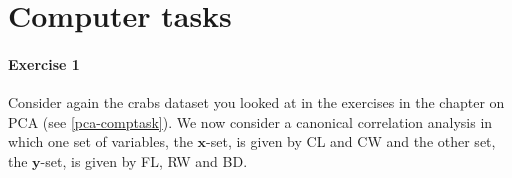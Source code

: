 \documentclass[]{book}
\newenvironment{Shaded}{\begin{snugshade}}{\end{snugshade}}
\newcommand{\CommentTok}[1]{\textcolor[rgb]{0.56,0.35,0.01}{\textit{#1}}}
\newcommand{\DecValTok}[1]{\textcolor[rgb]{0.00,0.00,0.81}{#1}}
\newcommand{\KeywordTok}[1]{\textcolor[rgb]{0.13,0.29,0.53}{\textbf{#1}}}
\newcommand{\NormalTok}[1]{#1}
\newcommand{\OperatorTok}[1]{\textcolor[rgb]{0.81,0.36,0.00}{\textbf{#1}}}
\newcommand{\StringTok}[1]{\textcolor[rgb]{0.31,0.60,0.02}{#1}}
\let\oldparagraph\paragraph
\renewcommand{\paragraph}[1]{\oldparagraph{#1}\mbox{}}
\theoremstyle{definition}
\theoremstyle{definition}
\theoremstyle{definition}
\theoremstyle{remark}
\begin{document}
\hypertarget{computer-tasks-1}{%
\section{Computer tasks}\label{computer-tasks-1}}

\hypertarget{exercise-1-1}{%
\paragraph{Exercise 1}\label{exercise-1-1}}

Consider again the crabs dataset you looked at in the exercises in the chapter on PCA (see \ref{pca-comptask}).
We now consider a canonical correlation analysis in which one set of variables, the \(\mathbf x\)-set, is given by CL and CW and the
other set, the \(\mathbf y\)-set, is given by FL, RW and BD.

\begin{Shaded}
\end{Shaded}
\end{document}
